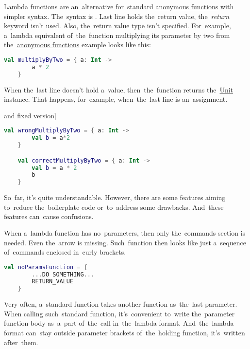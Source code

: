 Lambda functions are an~alternative for~standard \hyperref[kotlinanonymousfunction]{anonymous functions} with simpler syntax.
The~syntax is .
Last line holds the~return value, \mbox{the \textit{return}} keyword isn't used.
Also, the~return value type isn't specified.
For~example, a~lambda equivalent of~the~function multiplying its parameter by two from the~\hyperref[kotlinanonymousfunction]{anonymous functions} example looks like this:
\begin{lstlisting}[language=Kotlin]
    val multiplyByTwo = { a: Int ->
        a * 2
    }
\end{lstlisting}
\newline

\noindent When the~last line doesn't hold a~value, then~the~function returns the~\hyperref[kotlinunit]{Unit} instance.
That happens, for~example, when~the~last line is an~assignment.

\example[Lambda functions returning \hyperref[kotlinunit]{Unit} and fixed version]
\begin{lstlisting}[language=Kotlin]
    val wrongMultiplyByTwo = { a: Int ->
        val b = a*2
    }

    val correctMultiplyByTwo = { a: Int ->
        val b = a * 2
        b
    }
\end{lstlisting}
\newline

\noindent So~far, it's quite understandable.
However, there are some features aiming to~reduce the~boilerplate code or~to~address some drawbacks.
And~these features can~cause confusions.

When a~lambda function has no~parameters, then only the~commands section is needed.
Even the~arrow is missing.
Such~function then looks like just a~sequence of~commands enclosed in~curly brackets.

\begin{lstlisting}[language=Kotlin]
    val noParamsFunction = {
        ...DO SOMETHING...
        RETURN_VALUE
    }
\end{lstlisting}

Very often, a~standard function takes another function as~the~last parameter.
When calling such~standard function, it's~convenient to~write the~parameter function body as~a~part of~the~call in~the~lambda format.
And~the~lambda format can~stay outside parameter brackets of~the~holding function, it's~written after~them.

